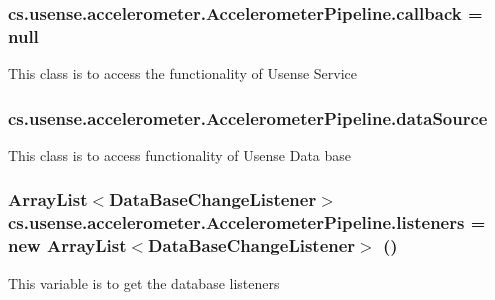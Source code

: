 \subsubsection[{callback}]{ cs.\+usense.\+accelerometer.\+Accelerometer\+Pipeline.\+callback = null\hspace{0.3cm}{\ttfamily [private]}}\label{classcs_1_1usense_1_1accelerometer_1_1_accelerometer_pipeline_a2066e6ad6ad9c458c1a92ba3212618c9}
This class is to access the functionality of Usense Service \hypertarget{classcs_1_1usense_1_1accelerometer_1_1_accelerometer_pipeline_a7eb5f78b5db36060e6b97578b6677162}{}
\subsubsection[{data\+Source}]{ cs.\+usense.\+accelerometer.\+Accelerometer\+Pipeline.\+data\+Source\hspace{0.3cm}{\ttfamily [private]}}\label{classcs_1_1usense_1_1accelerometer_1_1_accelerometer_pipeline_a7eb5f78b5db36060e6b97578b6677162}
This class is to access functionality of Usense Data base \hypertarget{classcs_1_1usense_1_1accelerometer_1_1_accelerometer_pipeline_a53be507081832940272735b836637663}{}
\subsubsection[{listeners}]{\setlength{\rightskip}{0pt plus 5cm}Array\+List$<${\bf Data\+Base\+Change\+Listener}$>$ cs.\+usense.\+accelerometer.\+Accelerometer\+Pipeline.\+listeners = new Array\+List$<${\bf Data\+Base\+Change\+Listener}$>$ ()\hspace{0.3cm}{\ttfamily [private]}}\label{classcs_1_1usense_1_1accelerometer_1_1_accelerometer_pipeline_a53be507081832940272735b836637663}
This variable is to get the database listeners \hypertarget{classcs_1_1usense_1_1accelerometer_1_1_accelerometer_pipeline_a2ca26caa30a7a702089708c1586147b1}{}
